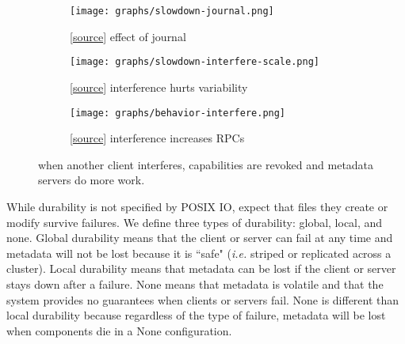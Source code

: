 \begin{figure*}[t]
  \centering
  \begin{subfigure}[b]{.32\linewidth}
      \centering
      \texttt{[image: graphs/slowdown-journal.png]}
      \caption{[\href{https://github.com/michaelsevilla/cudele-popper/blob/master/experiments/baseline-durability/visualize/viz.ipynb}{source}]
      effect of journal} \label{fig:overhead-a}
  \end{subfigure}
  \begin{subfigure}[b]{.32\linewidth}
      \centering
      \texttt{[image: graphs/slowdown-interfere-scale.png]}
      \caption{[\href{https://github.com/michaelsevilla/cudele-popper/blob/master/experiments/baseline-creates/visualize/viz.ipynb}{source}]
      interference hurts variability}
      \label{fig:overhead-b}
  \end{subfigure}
  \begin{subfigure}[b]{.32\linewidth}
      \centering
      \texttt{[image: graphs/behavior-interfere.png]}
      \caption{[\href{https://github.com/michaelsevilla/cudele-popper/blob/master/experiments/baseline-interfere/visualize/viz.ipynb}{source}]
      interference increases RPCs}
      \label{fig:overhead-c}
  \end{subfigure}
  \caption{ when another client interferes, capabilities are revoked and
metadata servers do more work.\vspace{-3ex}} \label{fig:overhead}
\end{figure*}

While durability is not specified by POSIX IO,
 expect that files they create or
modify survive failures.  We define three types of durability: global, local,
and none.  Global durability means that the client or server can fail at any
time and metadata will not be lost because it is ``safe" ({\it i.e.} striped or
replicated across a cluster). Local durability means that metadata can be lost
if the client or server stays down after a failure. None means that metadata is
volatile and that the system provides no guarantees when clients or servers
fail.  None is different than local durability because regardless of the type
of failure, metadata will be lost when components die in a None configuration.

